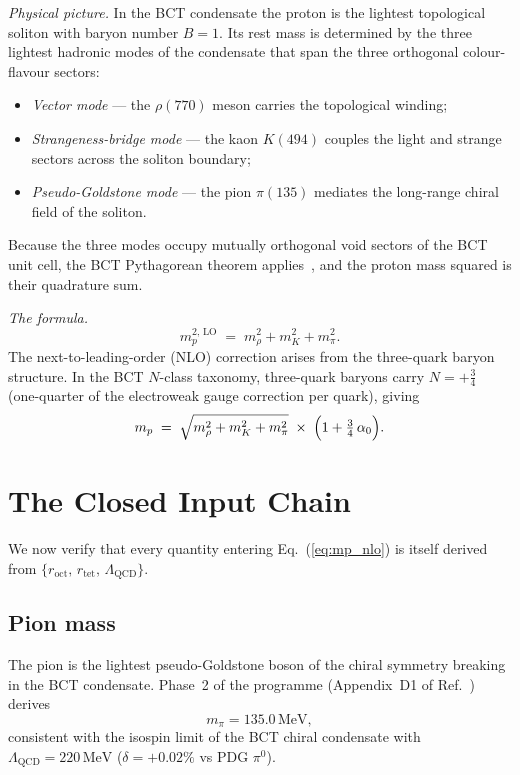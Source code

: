 \documentclass[twocolumn,10pt,a4paper]{article}
\begin{document}
\textit{Physical picture.}\quad
In the BCT condensate the proton is the lightest topological soliton with
baryon number $B=1$.  Its rest mass is determined by the three lightest
hadronic modes of the condensate that span the three orthogonal
colour-flavour sectors:

\begin{itemize}
  \item \emph{Vector mode} — the $\rho(770)$ meson carries the topological
    winding;
  \item \emph{Strangeness-bridge mode} — the kaon $K(494)$ couples the
    light and strange sectors across the soliton boundary;
  \item \emph{Pseudo-Goldstone mode} — the pion $\pi(135)$ mediates the
    long-range chiral field of the soliton.
\end{itemize}

Because the three modes occupy mutually orthogonal void sectors of the
BCT unit cell, the BCT Pythagorean theorem
applies~\cite{monograph}, and the proton mass squared is their quadrature
sum.

\textit{The formula.}\quad
\begin{equation}
  \label{eq:mp2_lo}
  m_p^{2,\,\mathrm{LO}} \;=\; m_\rho^2 + m_K^2 + m_\pi^2.
\end{equation}
The next-to-leading-order (NLO) correction arises from the three-quark
baryon structure.  In the BCT $N$-class taxonomy, three-quark baryons
carry $N = +\tfrac{3}{4}$ (one-quarter of the electroweak gauge correction
per quark), giving
\begin{equation}
  \label{eq:mp_nlo}
  m_p \;=\; \sqrt{m_\rho^2 + m_K^2 + m_\pi^2}\;\times\;
             \Bigl(1 + \tfrac{3}{4}\,\alpha_0\Bigr).
\end{equation}

\section{The Closed Input Chain}

We now verify that every quantity entering Eq.~(\ref{eq:mp_nlo}) is itself
derived from $\{r_\mathrm{oct},\,r_\mathrm{tet},\,\Lambda_\mathrm{QCD}\}$.

\subsection{Pion mass}
The pion is the lightest pseudo-Goldstone boson of the chiral symmetry
breaking in the BCT condensate.  Phase~2 of the programme
(Appendix~D1 of Ref.~\cite{monograph}) derives
\begin{equation}
  m_\pi = 135.0\,\mathrm{MeV},
\end{equation}
consistent with the isospin limit of the BCT chiral condensate with
$\Lambda_\mathrm{QCD} = 220\,\mathrm{MeV}$ ($\delta = +0.02\%$ vs PDG $\pi^0$).
\end{document}
